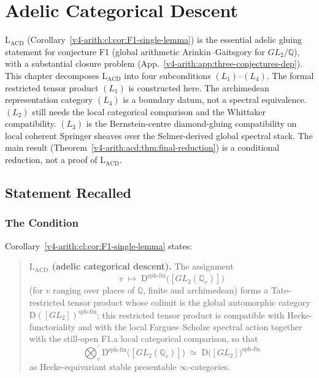 \chapter{Adelic Categorical Descent}
\label{v4-arith:adelic-descent}

\(\mathrm{L}_{\mathrm{ACD}}\) (Corollary~\ref{v4-arith:cl:cor:F1-single-lemma})
is the essential adelic gluing statement for conjecture F1 (global
arithmetic Arinkin--Gaitsgory for \(GL_{2}/\mathbb{Q}\)), with
a substantial closure problem
(App.~\ref{v4-arith:app:three-conjectures-dep}). This chapter decomposes
\(\mathrm{L}_{\mathrm{ACD}}\) into four subconditions
\((L_{1})\)--\((L_{4})\).  The formal restricted tensor product
\((L_{1})\) is constructed here.  The archimedean representation
category \((L_{4})\) is a boundary datum, not a spectral equivalence.
\((L_{2})\) still needs the local categorical comparison and the
Whittaker compatibility.  \((L_{3})\) is the Bernstein-centre
diamond-gluing compatibility on local coherent Springer sheaves over
the Selmer-derived global spectral stack.  The main result
(Theorem~\ref{v4-arith:acd:thm:final-reduction}) is a conditional reduction,
not a proof of \(\mathrm{L}_{\mathrm{ACD}}\).

\section{Statement Recalled}
\label{v4-arith:acd:statement}

\subsection{The Condition}

Corollary~\ref{v4-arith:cl:cor:F1-single-lemma} states:

\begin{quote}
\textbf{\(\mathrm{L}_{\mathrm{ACD}}\) (adelic categorical descent).}
The assignment
\begin{equation}
\label{v4-arith:acd:eq:assignment}
v\;\longmapsto\;\mathrm{D}^{\mathrm{sph\text{-}fin}}\bigl([GL_{2}(\mathbb{Q}_{v})]\bigr)
\end{equation}
(for \(v\) ranging over places of \(\mathbb{Q}\), finite and archimedean)
forms a Tate-restricted tensor product whose colimit is the global
automorphic category
\(\mathrm{D}([GL_{2}])^{\mathrm{sph\text{-}fin}}\); this restricted
tensor product is compatible with Hecke-functoriality and with the
local Fargues--Scholze spectral action together with the still-open
F1.a local categorical comparison, so that
\begin{equation}
\label{v4-arith:acd:eq:target}
\bigotimes_{v}^{\prime}\mathrm{D}^{\mathrm{sph\text{-}fin}}\bigl([GL_{2}(\mathbb{Q}_{v})]\bigr)
\;\simeq\;
\mathrm{D}\bigl([GL_{2}]\bigr)^{\mathrm{sph\text{-}fin}}
\end{equation}
as Hecke-equivariant stable presentable \(\infty\)-categories.
\end{quote}

